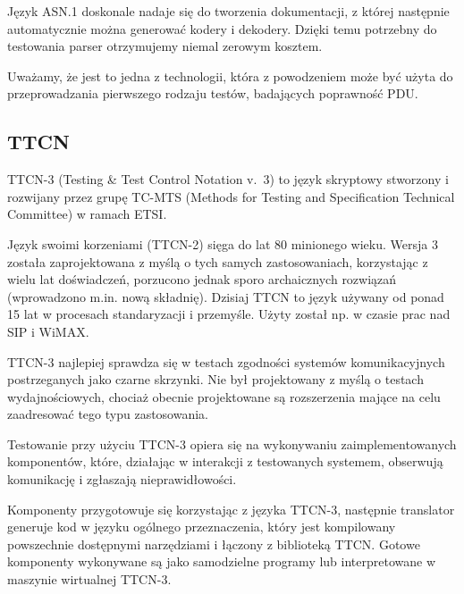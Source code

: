 \documentclass[00-praca-magisterska.tex]{subfiles}
\begin{document}

Język ASN.1 doskonale nadaje się do tworzenia dokumentacji, z której następnie
automatycznie można generować kodery i dekodery. Dzięki temu potrzebny do
testowania parser otrzymujemy niemal zerowym kosztem.

Uważamy, że jest to jedna z technologii, która z powodzeniem może być użyta do
przeprowadzania pierwszego rodzaju testów, badających poprawność PDU.

\subsection{TTCN}

TTCN-3 (Testing \& Test Control Notation v.~3) to język skryptowy stworzony i
rozwijany przez grupę TC-MTS (Methods for Testing and Specification Technical
Committee) w ramach ETSI.

Język swoimi korzeniami (TTCN-2) sięga do lat 80 minionego wieku. Wersja 3
została zaprojektowana z myślą o tych samych zastosowaniach, korzystając z wielu
lat doświadczeń, porzucono jednak sporo archaicznych rozwiązań (wprowadzono
m.in. nową składnię). Dzisiaj TTCN to język używany od ponad 15 lat w procesach
standaryzacji i przemyśle. Użyty został np. w czasie prac nad SIP i WiMAX.

TTCN-3 najlepiej sprawdza się w testach zgodności systemów komunikacyjnych
postrzeganych jako czarne skrzynki. Nie był projektowany z myślą o testach
wydajnościowych, chociaż obecnie projektowane są rozszerzenia mające na celu
zaadresować tego typu zastosowania.


Testowanie przy użyciu TTCN-3 opiera się na wykonywaniu zaimplementowanych
komponentów, które, działając w interakcji z testowanych systemem, obserwują
komunikację i zgłaszają nieprawidłowości.

Komponenty przygotowuje się korzystając z języka TTCN-3, następnie translator
generuje kod w języku ogólnego przeznaczenia, który jest kompilowany powszechnie
dostępnymi narzędziami i łączony z biblioteką TTCN. Gotowe komponenty wykonywane
są jako samodzielne programy lub interpretowane w maszynie wirtualnej TTCN-3.
\end{document}
